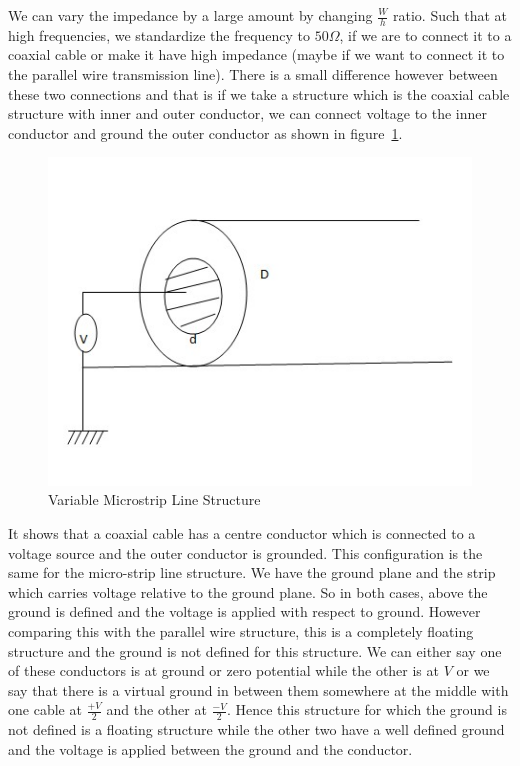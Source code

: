 We can vary the impedance by a large amount by changing $\frac{W}{h}$ ratio. Such that at high frequencies, we standardize the frequency to $50\varOmega$, if we are to connect it to a coaxial cable or make it have high impedance (maybe if we want to connect it to the parallel wire transmission line). There is a small difference however between these two connections and that is if we take a structure which is the coaxial cable structure with inner and outer conductor, we can connect voltage to the inner conductor and ground the outer conductor as shown in figure~\ref{fig:microstripvar}.
\begin{figure}[h]
\centering
\includegraphics[width=1\linewidth]{graphics/ground}
\caption{Variable Microstrip Line Structure}
\label{fig:microstripvar}
\end{figure}

It shows that a coaxial cable has a centre conductor which is connected to a voltage source and the outer conductor is grounded. This configuration is the same for the micro-strip line structure. We have the ground plane and the strip which carries voltage relative to the ground plane. So in both cases, above the ground is defined and the voltage is applied with respect to ground. However comparing this with the parallel wire structure, this is a completely floating structure and the ground is not defined for this structure. We can either say one of these conductors is at ground or zero potential while the other is at $V$ or we say that there is a virtual ground in between them somewhere at the middle with one cable at $\frac{+V}{2}$ and the other at $\frac{-V}{2}$. Hence this structure for which the ground is not defined is a floating structure while the other two have a well defined ground and the voltage is applied between the ground and the conductor.

